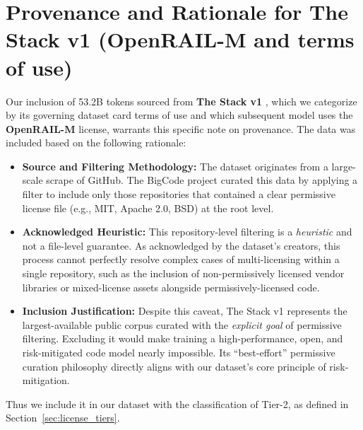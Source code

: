 \section{Provenance and Rationale for The Stack v1 (OpenRAIL-M and terms of use)}
\label{app:stack}

Our inclusion of 53.2B tokens sourced from \textbf{The Stack v1} \citep{kocetkov2023the}, which we categorize by its governing dataset card terms of use and which subsequent model uses the \textbf{OpenRAIL-M} license, warrants this specific note on provenance. The data was included based on the following rationale:

\begin{itemize}
    \item \textbf{Source and Filtering Methodology:} The dataset originates from a large-scale scrape of GitHub. The BigCode project curated this data by applying a filter to include only those repositories that contained a clear permissive license file (e.g., MIT, Apache 2.0, BSD) at the root level.

    \item \textbf{Acknowledged Heuristic:} This repository-level filtering is a \textit{heuristic} and not a file-level guarantee. As acknowledged by the dataset's creators, this process cannot perfectly resolve complex cases of multi-licensing within a single repository, such as the inclusion of non-permissively licensed vendor libraries or mixed-license assets alongside permissively-licensed code.

    \item \textbf{Inclusion Justification:} Despite this caveat, The Stack v1 represents the largest-available public corpus curated with the \textit{explicit goal} of permissive filtering. Excluding it would make training a high-performance, open, and risk-mitigated code model nearly impossible. Its ``best-effort'' permissive curation philosophy directly aligns with our dataset's core principle of risk-mitigation.
\end{itemize}

Thus we include it in our dataset with the classification of Tier-2, as defined in Section~\ref{sec:license_tiers}.
